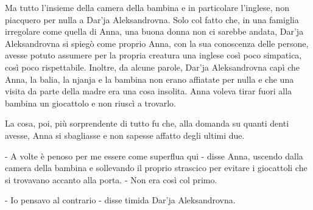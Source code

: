 Ma tutto l'insieme della camera della bambina e in particolare l'inglese, non piacquero per nulla a Dar'ja Aleksandrovna. Solo col fatto che, in una famiglia irregolare come quella di Anna, una buona donna non ci sarebbe andata, Dar'ja Aleksandrovna si spiegò come proprio Anna, con la sua conoscenza delle persone, avesse potuto assumere per la propria creatura una inglese così poco simpatica, così poco rispettabile. Inoltre, da alcune parole, Dar'ja Aleksandrovna capì che Anna, la balia, la njanja e la bambina non erano affiatate per nulla e che una visita da parte della madre era una cosa insolita. Anna voleva tirar fuori alla bambina un giocattolo e non riuscì a trovarlo. 

La cosa, poi, più sorprendente di tutto fu che, alla domanda su quanti denti avesse, Anna si sbagliasse e non sapesse affatto degli ultimi due. 

- A volte è penoso per me essere come superflua qui - disse Anna, uscendo dalla camera della bambina e sollevando il proprio strascico per evitare i giocattoli che si trovavano accanto alla porta. - Non era così col primo. 

- Io pensavo al contrario - disse timida Dar'ja Aleksandrovna. 

